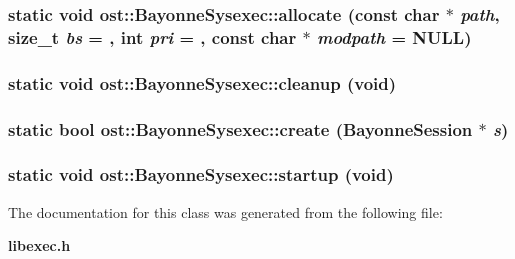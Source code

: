 \subsubsection[{allocate}]{\setlength{\rightskip}{0pt plus 5cm}static void ost::BayonneSysexec::allocate (const char $\ast$ {\em path}, \/  size\_\-t {\em bs} = {}, \/  int {\em pri} = {}, \/  const char $\ast$ {\em modpath} = {\ttfamily NULL})\hspace{0.3cm}{\ttfamily  [static]}}\label{classost_1_1_bayonne_sysexec_a556a3493c05a2baf5c121cf9f8771e1b}
\subsubsection[{cleanup}]{\setlength{\rightskip}{0pt plus 5cm}static void ost::BayonneSysexec::cleanup (void)\hspace{0.3cm}{\ttfamily  [static]}}\label{classost_1_1_bayonne_sysexec_a058ad8a0ad89e8c3b64629e70229c5cb}
\subsubsection[{create}]{\setlength{\rightskip}{0pt plus 5cm}static bool ost::BayonneSysexec::create ({\bf BayonneSession} $\ast$ {\em s})\hspace{0.3cm}{\ttfamily  [static]}}\label{classost_1_1_bayonne_sysexec_a3430ed9f2f5f0552c83602f4388c19e0}
\subsubsection[{startup}]{\setlength{\rightskip}{0pt plus 5cm}static void ost::BayonneSysexec::startup (void)\hspace{0.3cm}{\ttfamily  [static]}}\label{classost_1_1_bayonne_sysexec_ae59d4bccbb76466fdca4fd811115d598}


The documentation for this class was generated from the following file:\begin{DoxyCompactItemize}
\item 
{\bf libexec.h}\end{DoxyCompactItemize}
